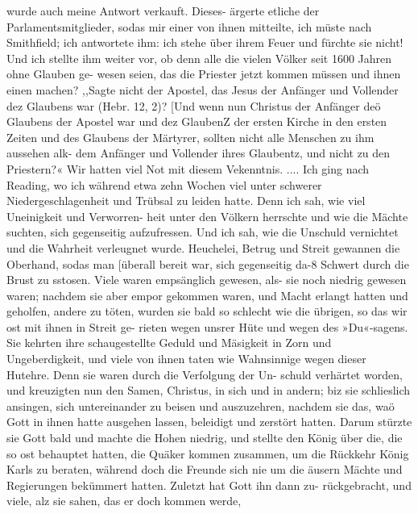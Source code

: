 wurde auch meine Antwort verkauft. Dieses- ärgerte etliche der
Parlamentsmitglieder, sodas mir einer von ihnen mitteilte, ich
müste nach Smithfield; ich antwortete ihm: ich stehe über ihrem
Feuer und fürchte sie nicht! Und ich stellte ihm weiter vor, ob
denn alle die vielen Völker seit 1600 Jahren ohne Glauben ge-
wesen seien, das die Priester jetzt kommen müssen und ihnen einen
machen? ,,Sagte nicht der Apostel, das Jesus der Anfänger und
Vollender dez Glaubens war (Hebr. 12, 2)? [Und wenn nun
Christus der Anfänger deö Glaubens der Apostel war und dez
GlaubenZ der ersten Kirche in den ersten Zeiten und des Glaubens
der Märtyrer, sollten nicht alle Menschen zu ihm aussehen alk-
dem Anfänger und Vollender ihres Glaubentz, und nicht zu den
Priestern?« Wir hatten viel Not mit diesem Vekenntnis. ....
Ich ging nach Reading, wo ich während etwa zehn Wochen
viel unter schwerer Niedergeschlagenheit und Trübsal zu leiden
hatte. Denn ich sah, wie viel Uneinigkeit und Verworren-
heit unter den Völkern herrschte und wie die Mächte suchten, sich
gegenseitig aufzufressen. Und ich sah, wie die Unschuld vernichtet
und die Wahrheit verleugnet wurde. Heuchelei, Betrug und
Streit gewannen die Oberhand, sodas man [überall bereit war,
sich gegenseitig da-8 Schwert durch die Brust zu sstosen. Viele
waren empsänglich gewesen, als- sie noch niedrig gewesen waren;
nachdem sie aber empor gekommen waren, und Macht erlangt
hatten und geholfen, andere zu töten, wurden sie bald so
schlecht wie die übrigen, so das wir ost mit ihnen in Streit ge-
rieten wegen unsrer Hüte und wegen des »Du«-sagens. Sie
kehrten ihre schaugestellte Geduld und Mäsigkeit in Zorn und
Ungeberdigkeit, und viele von ihnen taten wie Wahnsinnige wegen
dieser Hutehre. Denn sie waren durch die Verfolgung der Un-
schuld verhärtet worden, und kreuzigten nun den Samen,
Christus, in sich und in andern; biz sie schlieslich ansingen, sich
untereinander zu beisen und auszuzehren, nachdem sie das, waö
Gott in ihnen hatte ausgehen lassen, beleidigt und zerstört hatten.
Darum stürzte sie Gott bald und machte die Hohen niedrig, und
stellte den König über die, die so ost behauptet hatten, die Quäker
kommen zusammen, um die Rückkehr König Karls zu beraten,
während doch die Freunde sich nie um die äusern Mächte und
Regierungen bekümmert hatten. Zuletzt hat Gott ihn dann zu-
rückgebracht, und viele, alz sie sahen, das er doch kommen werde,



